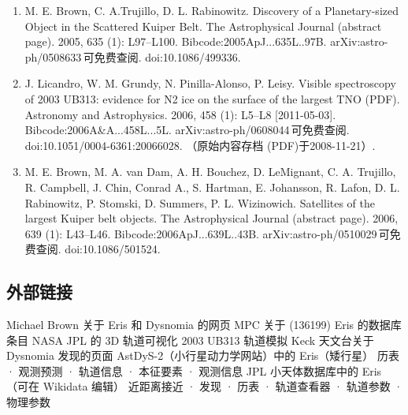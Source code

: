 \begin{enumerate}
\item M. E. Brown, C. A.Trujillo, D. L. Rabinowitz. Discovery of a Planetary-sized Object in the Scattered Kuiper Belt. The Astrophysical Journal (abstract page). 2005, 635 (1): L97–L100. Bibcode:2005ApJ...635L..97B. arXiv:astro-ph/0508633 可免费查阅. doi:10.1086/499336.
\item J. Licandro, W. M. Grundy, N. Pinilla-Alonso, P. Leisy. Visible spectroscopy of 2003 UB313: evidence for N2 ice on the surface of the largest TNO (PDF). Astronomy and Astrophysics. 2006, 458 (1): L5–L8 [2011-05-03]. Bibcode:2006A&A...458L...5L. arXiv:astro-ph/0608044 可免费查阅. doi:10.1051/0004-6361:20066028. （原始内容存档 (PDF)于2008-11-21）.
\item M. E. Brown, M. A. van Dam, A. H. Bouchez, D. LeMignant, C. A. Trujillo, R. Campbell, J. Chin, Conrad A., S. Hartman, E. Johansson, R. Lafon, D. L. Rabinowitz, P. Stomski, D. Summers, P. L. Wizinowich. Satellites of the largest Kuiper belt objects. The Astrophysical Journal (abstract page). 2006, 639 (1): L43–L46. Bibcode:2006ApJ...639L..43B. arXiv:astro-ph/0510029 可免费查阅. doi:10.1086/501524.
\end{enumerate}


\subsection{外部链接}

Michael Brown 关于 Eris 和 Dysnomia 的网页  
MPC 关于 (136199) Eris 的数据库条目  
NASA JPL 的 3D 轨道可视化  
2003 UB313 轨道模拟  
Keck 天文台关于 Dysnomia 发现的页面  
AstDyS-2（小行星动力学网站）中的 Eris（矮行星）  
历表 · 观测预测 · 轨道信息 · 本征要素 · 观测信息  
JPL 小天体数据库中的 Eris（可在 Wikidata 编辑）  
近距离接近 · 发现 · 历表 · 轨道查看器 · 轨道参数 · 物理参数













